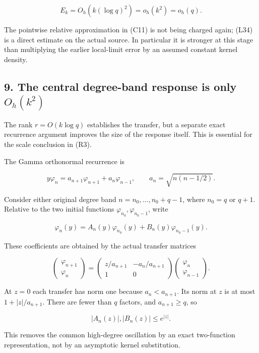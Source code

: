 \documentclass[11pt,a4paper]{article}
\begin{document}
\[
E_k=O_h(k(\log q)^2)=o_h(k^2)=o_h(q).
\tag{L35}
\]

The pointwise relative approximation in (C11) is not being charged again; (L34) is a direct estimate on the actual source. In particular it is stronger at this stage than multiplying the earlier local-limit error by an assumed constant kernel density.

\subsection{\texorpdfstring{9. The central degree-band response is only \(O_h(k^2)\)}{9. The central degree-band response is only O\_h(k\^{}2)}}\label{loc:the-central-degree-band-response-is-only-o_hk2}

The rank \(r=O(k\log q)\) establishes the transfer, but a separate exact recurrence argument improves the size of the response itself. This is essential for the scale conclusion in (R3).

The Gamma orthonormal recurrence is

\[
y\varphi_n=a_{n+1}\varphi_{n+1}+a_n\varphi_{n-1},\qquad
a_n=\sqrt{n(n-1/2)}.
\tag{L36}
\]

Consider either original degree band \(n=n_0,\ldots,n_0+q-1\), where \(n_0=q\) or \(q+1\). Relative to the two initial functions \(\varphi_{n_0},\varphi_{n_0-1}\), write

\[
\varphi_n(y)=A_n(y)\varphi_{n_0}(y)+B_n(y)\varphi_{n_0-1}(y).
\tag{L37}
\]

These coefficients are obtained by the actual transfer matrices

\[
\begin{pmatrix}\varphi_{n+1}\\\varphi_n\end{pmatrix}
=\begin{pmatrix}z/a_{n+1}&-a_n/a_{n+1}\\1&0\end{pmatrix}
\begin{pmatrix}\varphi_n\\\varphi_{n-1}\end{pmatrix}.
\]

At \(z=0\) each transfer has norm one because \(a_n<a_{n+1}\). Its norm at \(z\) is at most \(1+|z|/a_{n+1}\). There are fewer than \(q\) factors, and \(a_{n+1}\ge q\), so

\[
|A_n(z)|,|B_n(z)|\le e^{|z|}.
\tag{L38}
\]

This removes the common high-degree oscillation by an exact two-function representation, not by an asymptotic kernel substitution.
\end{document}
